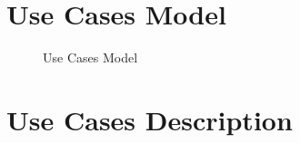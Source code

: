 \documentclass[english,12pt,twoside,a4paper]{report}
\newcommand{\image}[4]{
  \begin{figure}[ht]
    \centering
    \fbox{\texttt{[image: \#1]}}
    \caption{#3}
    \label{fig:#4}
  \end{figure}
}
\newcommand{\usecase}[3]{
  \fbox{%
    \parbox{0.3\linewidth}{%
      \centering
      \textbf{#1}\\
      \vspace{0.5em}
      \textit{Assignee : #2}\\
      \textit{Complexity : #3/5}
    }%
  }%
}
\begin{document}
\chapter{Use Cases Model}
\image{usecase.png}{0.65}{Use Cases Model}{usecasesModel}
\vfill






\chapter{Use Cases Description}






\pagebreak
\end{document}
